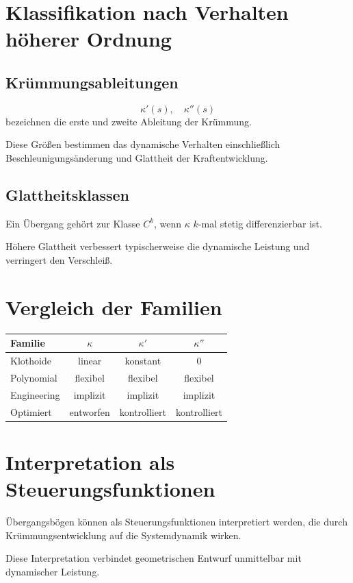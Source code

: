 \section{Klassifikation nach Verhalten höherer Ordnung}
\subsection{Krümmungsableitungen}
\begin{definition}
\[
\kappa'(s),\quad\kappa''(s)
\]
bezeichnen die erste und zweite Ableitung der Krümmung.
\end{definition}
Diese Größen bestimmen das dynamische Verhalten einschließlich
Beschleunigungsänderung und Glattheit der Kraftentwicklung.

\subsection{Glattheitsklassen}
\begin{definition}
Ein Übergang gehört zur Klasse \(C^k\), wenn \(\kappa\) \(k\)-mal stetig
differenzierbar ist.
\end{definition}
Höhere Glattheit verbessert typischerweise die dynamische Leistung und
verringert den Verschleiß.

\section{Vergleich der Familien}
\begin{center}
\begin{tabular}{lccc}
\textbf{Familie} & $\kappa$ & $\kappa'$ & $\kappa''$ \\
\hline
Klothoide & linear & konstant & 0 \\
Polynomial & flexibel & flexibel & flexibel \\
Engineering & implizit & implizit & implizit \\
Optimiert & entworfen & kontrolliert & kontrolliert \\
\end{tabular}
\end{center}

\section{Interpretation als Steuerungsfunktionen}
\begin{proposition}
Übergangsbögen können als Steuerungsfunktionen interpretiert werden, die durch
Krümmungsentwicklung auf die Systemdynamik wirken.
\end{proposition}
Diese Interpretation verbindet geometrischen Entwurf unmittelbar mit
dynamischer Leistung.

